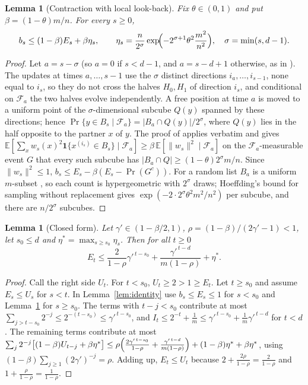 \documentclass[11pt]{amsart}
\newtheorem{lemma}[theorem]{Lemma}
\theoremstyle{remark}
\newcommand{\E}{\mathbb E}
\begin{document}
\begin{lemma}[Contraction with local look-back]\label{lem:contraction}
Fix $\theta\in(0,1)$ and put $\beta=(1-\theta)m/n$. For every $s\ge0$,
\[
b_s\le(1-\beta)E_s+\beta\eta_s,\qquad
\eta_s=\frac{n}{2^{\sigma}}\exp\!\Bigl(-2^{\sigma+1}\theta^2\frac{m^2}{n^2}\Bigr),\quad\sigma=\min(s,d-1).
\]
\end{lemma}
\begin{proof}
Let $a=s-\sigma$ (so $a=0$ if $s<d-1$, and $a=s-d+1$ otherwise, as in \cite[Section~4]{oai-thorp}).
The updates at times $a,\dots,s-1$ use the $\sigma$ distinct directions $i_a,\dots,i_{s-1}$, none equal
to $i_s$, so they do not cross the halves $H_0,H_1$ of direction $i_s$, and conditional on
$\mathcal F_a$ the two halves evolve independently. A free position at time $a$ is moved to a uniform
point of the $\sigma$-dimensional subcube $Q(y)$ spanned by these directions; hence
$\Pr\{y\in B_s\mid\mathcal F_a\}=|B_a\cap Q(y)|/2^{\sigma}$, where $Q(y)$ lies in the half opposite to
the partner $x$ of $y$. The proof of \cite[(4.1)]{oai-thorp} applies verbatim and gives
$\E[\sum_{x}w_s(x)^2\mathbf 1\{x^{(i_s)}\in B_s\}\mid\mathcal F_a]\ge\beta\,\E[\|w_s\|^2\mid\mathcal F_a]$
on the $\mathcal F_a$-measurable event $G$ that every such subcube has
$|B_a\cap Q|\ge(1-\theta)2^{\sigma}m/n$. Since $\|w_s\|^2\le1$, $b_s\le E_s-\beta(E_s-\Pr(G^c))$.
For a random list $B_a$ is a uniform $m$-subset \cite[Section~4]{oai-thorp}, so each count is
hypergeometric with $2^\sigma$ draws; Hoeffding's bound for sampling without replacement
\cite[Thm.~4]{hoeffding1963} gives $\exp(-2\cdot2^\sigma\theta^2m^2/n^2)$ per subcube, and there are
$n/2^\sigma$ subcubes.
\end{proof}

\begin{lemma}[Closed form]\label{lem:closed}
Let $\gamma'\in(1-\beta/2,1)$, $\rho=(1-\beta)/(2\gamma'-1)<1$, let $s_0\le d$ and
$\eta^*=\max_{s\ge s_0}\eta_s$. Then for all $t\ge0$
\[
E_t\le\frac{2}{1-\rho}\gamma'^{\,t-s_0}+\frac{\gamma'^{\,t-d}}{m(1-\rho)}+\eta^*.
\]
\end{lemma}
\begin{proof}
Call the right side $U_t$. For $t<s_0$, $U_t\ge2>1\ge E_t$. Let $t\ge s_0$ and assume $E_s\le U_s$
for $s<t$. In Lemma~\ref{lem:identity} use $b_s\le E_s\le 1$ for $s<s_0$ and
Lemma~\ref{lem:contraction} for $s\ge s_0$. The terms with $t-j<s_0$ contribute at most
$\sum_{j>t-s_0}2^{-j}\le2^{-(t-s_0)}\le\gamma'^{\,t-s_0}$, and $I_t\le2^{-t}+\frac1m\le\gamma'^{\,t-s_0}+\frac1m\gamma'^{\,t-d}$
for $t<d$. The remaining terms contribute at most
$\sum_j2^{-j}\bigl[(1-\beta)U_{t-j}+\beta\eta^*\bigr]\le\rho\Bigl(\frac{2\gamma'^{\,t-s_0}}{1-\rho}+\frac{\gamma'^{\,t-d}}{m(1-\rho)}\Bigr)+(1-\beta)\eta^*+\beta\eta^*$,
using $(1-\beta)\sum_{j\ge1}(2\gamma')^{-j}=\rho$. Adding up, $E_t\le U_t$ because
$2+\frac{2\rho}{1-\rho}=\frac2{1-\rho}$ and $1+\frac{\rho}{1-\rho}=\frac1{1-\rho}$.
\end{proof}
\end{document}
